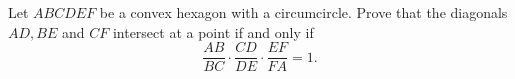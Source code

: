 Let $ABCDEF$ be a convex hexagon with a circumcircle.
Prove that the diagonals $AD, BE$ and $CF$ intersect at a point if and only if
$$\frac{AB}{BC} \cdot \frac{CD}{DE} \cdot \frac{EF}{FA} = 1.$$